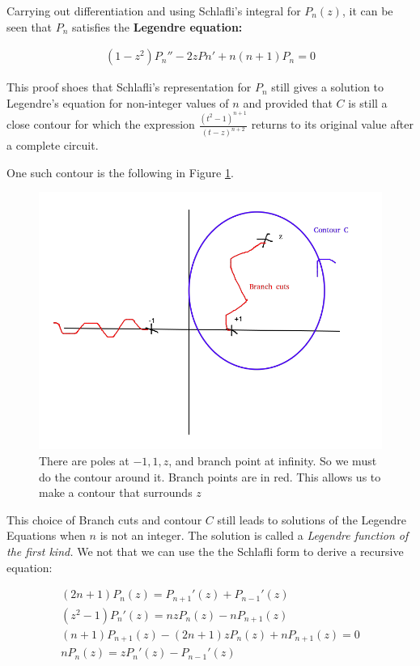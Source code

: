 \documentclass{article}
\theoremstyle{definition}
\begin{document}
Carrying out differentiation and using Schlafli's integral  for $P_n(z)$, it can be seen that $P_n$ satisfies the \textbf{Legendre equation:}

\begin{align*}
(1-z^2)P_n'' - 2zPn' + n(n+1)P_n = 0
\end{align*}

This proof shoes that Schlafli's representation for $P_n$ still gives a solution to Legendre's equation for non-integer values of $n$ and provided that $C$ is still a close contour for which the expression  $\frac{(t^2-1)^{n+1}}{(t-z)^{n+2}}$ returns to its original value after a complete circuit.

One such contour is the following in Figure \ref{fig:legbp}.

\begin{figure}[H]
	\centering
	\includegraphics[width=0.7\linewidth]{leg_bp}
	\caption{There are poles at $-1, 1, z$, and branch point at infinity. So we must do the contour around it. Branch points are in red. This allows us to make a contour that surrounds $z$ }
	\label{fig:legbp}
\end{figure}

This choice of Branch cuts and contour $C$ still leads to solutions of the Legendre Equations when $n$ is not an integer. The solution is called a \textit{Legendre function of the first kind.} We not that we can use the the Schlafli form to derive a recursive equation:

\begin{align*}
(2n+1) P_n(z) = P_{n+1}'(z) + P_{n-1}'(z) \\ 
(z^2-1) P_n'(z) = nzP_n(z)-nP_{n+1}(z) \\ 
(n+1)P_{n+1}(z) - (2n+1)zP_n(z) + nP_{n+1}(z) = 0\\
nP_n(z) = zP_n'(z)-P_{n-1}'(z)
\end{align*}
\end{document}
